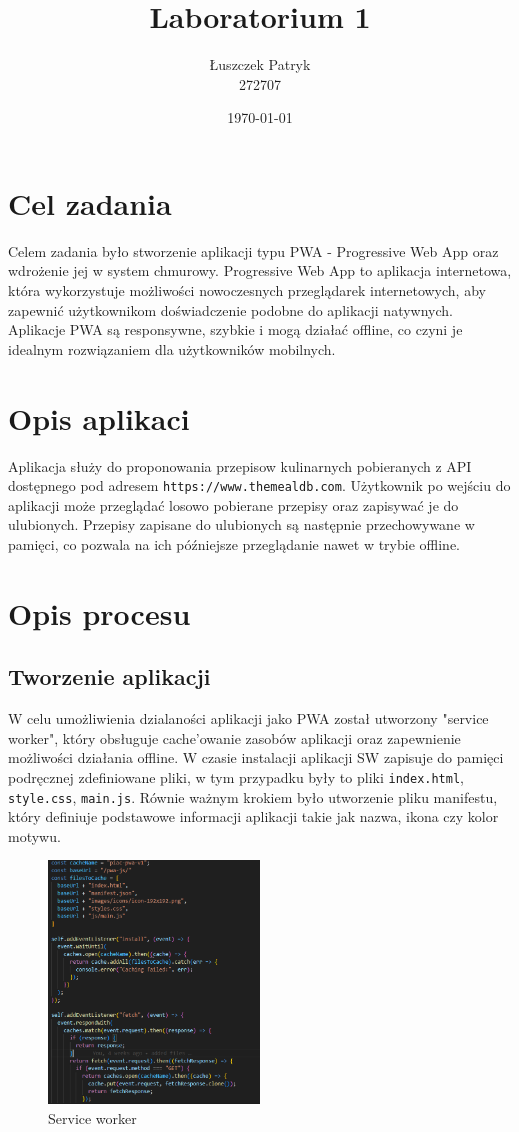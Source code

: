 \documentclass[a4paper,12pt]{article}
\title{Laboratorium 1}
\author{Łuszczek Patryk\\
        272707}
\date{\today}
\begin{document}
\maketitle

\section{Cel zadania}
Celem zadania było stworzenie aplikacji typu PWA - Progressive Web App oraz wdrożenie jej w system chmurowy.
Progressive Web App to aplikacja internetowa, która wykorzystuje możliwości nowoczesnych przeglądarek internetowych, aby zapewnić użytkownikom doświadczenie podobne do aplikacji natywnych. Aplikacje PWA są responsywne, szybkie i mogą działać offline, co czyni je idealnym rozwiązaniem dla użytkowników mobilnych.
\section{Opis aplikaci}
Aplikacja służy do proponowania przepisow kulinarnych pobieranych z API dostępnego pod adresem \texttt{https://www.themealdb.com}.
Użytkownik po wejściu do aplikacji może przeglądać losowo pobierane przepisy oraz zapisywać je do ulubionych. Przepisy zapisane do ulubionych są następnie przechowywane w pamięci, co pozwala na ich późniejsze przeglądanie nawet w trybie offline.

\section{Opis procesu}
\subsection{Tworzenie aplikacji}
W celu umożliwienia dzialaności aplikacji jako PWA został utworzony "service worker", który obsługuje cache'owanie zasobów aplikacji oraz zapewnienie możliwości działania offline.
W czasie instalacji aplikacji SW zapisuje do pamięci podręcznej zdefiniowane pliki, w tym przypadku były to pliki \texttt{index.html}, \texttt{style.css}, \texttt{main.js}.
Równie ważnym krokiem było utworzenie pliku manifestu, który definiuje podstawowe informacji aplikacji takie jak nazwa, ikona czy kolor motywu.

\begin{figure}[H]
    \centering
    \includegraphics[width=0.5\textwidth]{images/sw.png}
    \caption{Service worker}
    \label{fig:sw}
\end{figure}
\end{document}
